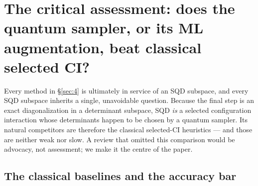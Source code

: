 \documentclass[11pt]{article}
\begin{document}
\section{The critical assessment: does the quantum sampler, or its ML augmentation, beat classical selected CI?}\label{sec:5}

Every method in \S\ref{sec:4} is ultimately in service of an SQD subspace, and every SQD subspace inherits a single, unavoidable question. Because the final step is an exact diagonalization in a determinant subspace, SQD \emph{is} a selected configuration interaction whose determinants happen to be chosen by a quantum sampler. Its natural competitors are therefore the classical selected-CI heuristics --- and those are neither weak nor slow. A review that omitted this comparison would be advocacy, not assessment; we make it the centre of the paper.


\subsection{The classical baselines and the accuracy bar}\label{sec:5-1}
\end{document}
